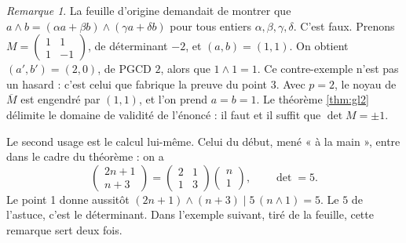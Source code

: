 \documentclass[11pt,a4paper]{article}
\theoremstyle{plain}
\theoremstyle{definition}
\theoremstyle{remark}
\newtheorem{remarque}[theoreme]{Remarque}
\newcommand{\pgcd}{\wedge}
\begin{document}
\begin{remarque}\label{rem:faux-gl2}
La feuille d'origine demandait de montrer que $a\pgcd b=(\alpha a+\beta b)\pgcd(\gamma a+\delta b)$ pour tous entiers $\alpha,\beta,\gamma,\delta$. C'est faux. Prenons $M=\begin{pmatrix}1&1\\1&-1\end{pmatrix}$, de déterminant $-2$, et $(a,b)=(1,1)$. On obtient $(a',b')=(2,0)$, de PGCD $2$, alors que $1\pgcd1=1$. Ce contre-exemple n'est pas un hasard : c'est celui que fabrique la preuve du point 3. Avec $p=2$, le noyau de $\overline M$ est engendré par $(1,1)$, et l'on prend $a=b=1$. Le théorème \ref{thm:gl2} délimite le domaine de validité de l'énoncé : il faut et il suffit que $\det M=\pm1$.
\end{remarque}

Le second usage est le calcul lui-même. Celui du début, mené « à la main », entre dans le cadre du théorème : on a
\[
  \begin{pmatrix}2n+1\\n+3\end{pmatrix}=\begin{pmatrix}2&1\\1&3\end{pmatrix}\begin{pmatrix}n\\1\end{pmatrix},
  \qquad \det=5 .
\]
Le point 1 donne aussitôt $(2n+1)\pgcd(n+3)\mid 5\,(n\pgcd1)=5$. Le $5$ de l'astuce, c'est le déterminant. Dans l'exemple suivant, tiré de la feuille, cette remarque sert deux fois.
\end{document}
